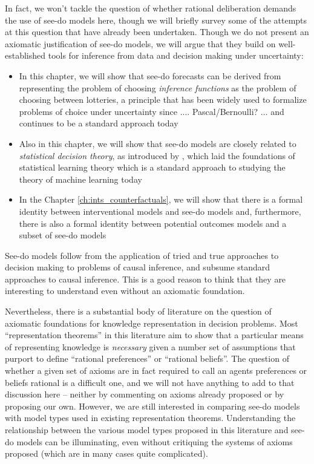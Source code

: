 In fact, we won't tackle the question of whether rational deliberation demands the use of see-do models here, though we will briefly survey some of the attempts at this question that have already been undertaken. Though we do not present an axiomatic justification of see-do models, we will argue that they build on well-established tools for inference from data and decision making under uncertainty:
\begin{itemize}
    \item In this chapter, we will show that see-do forecasts can be derived from representing the problem of choosing \emph{inference functions} as the problem of choosing between lotteries, a principle that has been widely used to formalize problems of choice under uncertainty since .... Pascal/Bernoulli? ... and continues to be a standard approach today 
    \item Also in this chapter, we will show that see-do models are closely related to \emph{statistical decision theory}, as introduced by \citet{wald_statistical_1950}, which laid the foundations of statistical learning theory \citep{vapnik_nature_2013} which is a standard approach to studying the theory of machine learning today
    \item In the Chapter \ref{ch:ints_counterfactuals}, we will show that there is a formal identity between interventional models and see-do models and, furthermore, there is also a formal identity between potential outcomes models and a subset of see-do models
\end{itemize} 

See-do models follow from the application of tried and true approaches to decision making to problems of causal inference, and subsume standard approaches to causal inference. This is a good reason to think that they are interesting to understand even without an axiomatic foundation.

Nevertheless, there is a substantial body of literature on the question of axiomatic foundations for knowledge representation in decision problems. Most ``representation theorems'' in this literature aim to show that a particular means of representing knowledge is \emph{necessary} given a number set of assumptions that purport to define ``rational preferences'' or ``rational beliefs''. The question of whether a given set of axioms are in fact required to call an agents preferences or beliefs rational is a difficult one, and we will not have anything to add to that discussion here -- neither by commenting on axioms already proposed or by proposing our own. However, we are still interested in comparing see-do models with model types used in existing representation theorems. Understanding the relationship between the various model types proposed in this literature and see-do models can be illuminating, even without critiquing the systems of axioms proposed (which are in many cases quite complicated).

